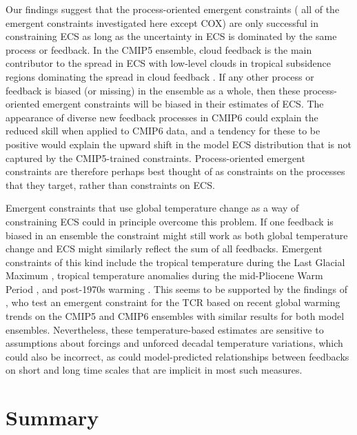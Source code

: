 Our findings suggest that the process-oriented emergent constraints (\ie{} all
of the emergent constraints investigated here except COX) are only successful
in constraining \ac{ECS} as long as the uncertainty in \ac{ECS} is dominated by
the same process or feedback. In the \acs{CMIP}5 ensemble, cloud feedback is
the main contributor to the spread in \ac{ECS} with low-level clouds in
tropical subsidence regions dominating the spread in cloud feedback
\autocite{Ceppi2017}. If any other process or feedback is biased (or missing)
in the ensemble as a whole, then these process-oriented emergent constraints
will be biased in their estimates of \ac{ECS}. The appearance of diverse new
feedback processes in \acs{CMIP}6 could explain the reduced skill when applied
to \acs{CMIP}6 data, and a tendency for these to be positive would explain the
upward shift in the model \ac{ECS} distribution that is not captured by the
\acs{CMIP}5-trained constraints. Process-oriented emergent constraints are
therefore perhaps best thought of as constraints on the processes that they
target, rather than constraints on \ac{ECS}.

Emergent constraints that use global temperature change as a way of
constraining \ac{ECS} could in principle overcome this problem. If one feedback
is biased in an ensemble the constraint might still work as both global
temperature change and \ac{ECS} might similarly reflect the sum of all
feedbacks. Emergent constraints of this kind include the tropical temperature
during the Last Glacial Maximum \autocite{Hargreaves2012}, tropical temperature
anomalies during the mid-Pliocene Warm Period \autocite{Hargreaves2016}, and
post-1970s warming \autocite{JimenezdelaCuesta2019}. This seems to be supported
by the findings of \textcite{Tokarska2020}, who test an emergent constraint for
the \ac{TCR} based on recent global warming trends on the \acs{CMIP}5 and
\acs{CMIP}6 ensembles with similar results for both model ensembles.
Nevertheless, these temperature-based estimates are sensitive to assumptions
about forcings and unforced decadal temperature variations, which could also be
incorrect, as could model-predicted relationships between feedbacks on short
and long time scales that are implicit in most such measures.


\section{Summary}
\label{sec:05:summary}

